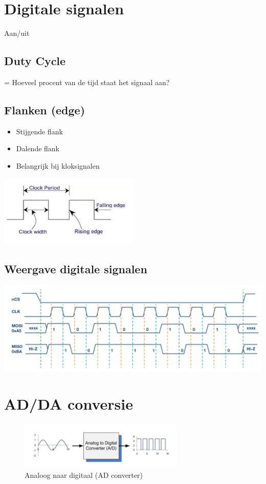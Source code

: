 \documentclass{article}
\begin{document}
\section{Digitale signalen}
Aan/uit


\subsection{Duty Cycle}
= Hoeveel procent van de tijd staat het signaal aan?

\subsection{Flanken (edge)}
\begin{itemize}
    \item Stijgende flank
    \item Dalende flank
    \item Belangrijk bij kloksignalen
\end{itemize}

\includegraphics[width=0.5\textwidth]{Screenshot_20200217_123230.png}

\subsection{Weergave digitale signalen}
\includegraphics[width=1\textwidth]{Screenshot_20200217_125726.png}

\section{AD/DA conversie}

\begin{figure}[H]
    \centering
    \includegraphics[width=0.7\textwidth]{Screenshot_20200224_115204.png}
    \caption{Analoog naar digitaal (AD converter)}
\end{figure}
\end{document}
